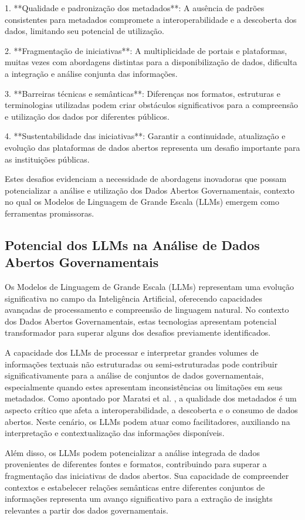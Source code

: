 1. **Qualidade e padronização dos metadados**: A ausência de padrões consistentes para metadados compromete a interoperabilidade e a descoberta dos dados, limitando seu potencial de utilização.

2. **Fragmentação de iniciativas**: A multiplicidade de portais e plataformas, muitas vezes com abordagens distintas para a disponibilização de dados, dificulta a integração e análise conjunta das informações.

3. **Barreiras técnicas e semânticas**: Diferenças nos formatos, estruturas e terminologias utilizadas podem criar obstáculos significativos para a compreensão e utilização dos dados por diferentes públicos.

4. **Sustentabilidade das iniciativas**: Garantir a continuidade, atualização e evolução das plataformas de dados abertos representa um desafio importante para as instituições públicas.

Estes desafios evidenciam a necessidade de abordagens inovadoras que possam potencializar a análise e utilização dos Dados Abertos Governamentais, contexto no qual os Modelos de Linguagem de Grande Escala (LLMs) emergem como ferramentas promissoras.

\subsection{Potencial dos LLMs na Análise de Dados Abertos Governamentais}

Os Modelos de Linguagem de Grande Escala (LLMs) representam uma evolução significativa no campo da Inteligência Artificial, oferecendo capacidades avançadas de processamento e compreensão de linguagem natural. No contexto dos Dados Abertos Governamentais, estas tecnologias apresentam potencial transformador para superar alguns dos desafios previamente identificados.

A capacidade dos LLMs de processar e interpretar grandes volumes de informações textuais não estruturadas ou semi-estruturadas pode contribuir significativamente para a análise de conjuntos de dados governamentais, especialmente quando estes apresentam inconsistências ou limitações em seus metadados. Como apontado por Maratsi et al. \cite{ref_6}, a qualidade dos metadados é um aspecto crítico que afeta a interoperabilidade, a descoberta e o consumo de dados abertos. Neste cenário, os LLMs podem atuar como facilitadores, auxiliando na interpretação e contextualização das informações disponíveis.

Além disso, os LLMs podem potencializar a análise integrada de dados provenientes de diferentes fontes e formatos, contribuindo para superar a fragmentação das iniciativas de dados abertos. Sua capacidade de compreender contextos e estabelecer relações semânticas entre diferentes conjuntos de informações representa um avanço significativo para a extração de insights relevantes a partir dos dados governamentais.

